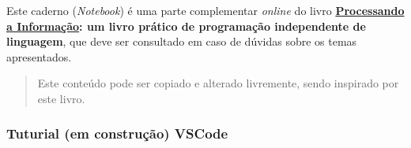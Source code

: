 \documentclass[12pt,a4paper]{article}
\begin{document}
Este caderno (\emph{Notebook}) é uma parte complementar \emph{online} do
livro
\textbf{\href{https://editora.ufabc.edu.br/matematica-e-ciencias-da-computacao/58-processando-a-informacao}{Processando
a Informação}: um livro prático de programação independente de
linguagem}, que deve ser consultado em caso de dúvidas sobre os temas
apresentados.

\begin{quote}
Este conteúdo pode ser copiado e alterado livremente, sendo inspirado
por este livro.
\end{quote}

    \hypertarget{tuturial-em-construuxe7uxe3o-vscode}{%
\subsubsection{Tuturial (em construção)
VSCode}\label{tuturial-em-construuxe7uxe3o-vscode}}
\end{document}
